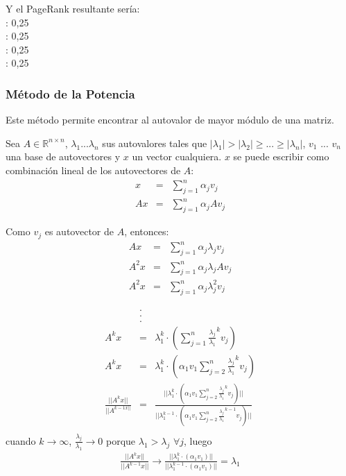 \documentclass[a4paper]{article}
\begin{document}
Y el PageRank resultante sería: \\

: 0,25 \\
: 0,25 \\
: 0,25 \\
: 0,25 \\

\subsubsection{M\'{e}todo de la Potencia}

Este método permite encontrar al autovalor de mayor módulo de una matriz.

Sea $A \in \mathbb{R}^{n \times n}$, $\lambda_1 ... \lambda_n$ sus autovalores tales que $|\lambda_1|>|\lambda_2| \geq ... \geq |\lambda_n|$, $v_1$ ... $v_n$ una base de autovectores
y $x$ un vector cualquiera. $x$ se puede escribir como combinación lineal de los autovectores de $A$:
\begin{eqnarray*}
x & = &\sum_{j=1}^{n} \alpha_j v_j\\
Ax & = &\sum_{j=1}^{n} \alpha_j Av_j
\end{eqnarray*}

Como $v_j$ es autovector de $A$, entonces:
\begin{eqnarray*}
Ax&=&\sum_{j=1}^{n} \alpha_j \lambda_j v_j\\
A^2x&=&\sum_{j=1}^{n} \alpha_j \lambda_j Av_j\\
A^2x&=&\sum_{j=1}^{n} \alpha_j \lambda^2_j v_j
\end{eqnarray*}

\begin{eqnarray*}
&.&\\
&.&\\
&.&\\
A^kx&=&\lambda_1^k \cdot (\sum_{j=1}^{n} \frac {\lambda_j}{\lambda_1}^k v_j)\\
A^kx&=&\lambda_1^k \cdot (\alpha_1 v_1 \sum_{j=2}^{n} \frac {\lambda_j}{\lambda_1}^k v_j)\\
\frac{||A^kx||}{||A^{k-1x||}}&=&\frac{||\lambda_1^k \cdot (\alpha_1 v_1 \sum_{j=2}^{n} \frac {\lambda_j}{\lambda_1}^k v_j)||}{||\lambda_1^{k-1} \cdot (\alpha_1 v_1 \sum_{j=2}^{n} \frac {\lambda_j}{\lambda_1}^{k-1} v_j)||}\\
\end{eqnarray*}
cuando $k \rightarrow \infty$, $\frac{\lambda_j}{\lambda_1} \rightarrow 0$ porque $\lambda_1>\lambda_j$ $\forall j$, luego 
\begin{eqnarray*}
\frac{||A^kx||}{||A^{k-1}x||} \rightarrow \frac{||\lambda_1^k \cdot (\alpha_1 v_1) ||}{||\lambda_1^{k-1} \cdot (\alpha_1 v_1)||} = \lambda_1
\end{eqnarray*}
\end{document}
